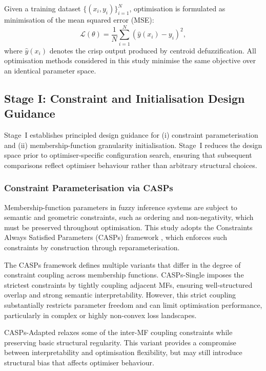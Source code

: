 \documentclass[conference]{IEEEtran}
\begin{document}
Given a training dataset $\{(x_i, y_i)\}_{i=1}^{N}$, optimisation is formulated
as minimisation of the mean squared error (MSE):
\begin{equation}
\mathcal{L}(\theta)
=
\frac{1}{N}
\sum_{i=1}^{N}
\left( \hat{y}(x_i) - y_i \right)^2 ,
\end{equation}
where $\hat{y}(x_i)$ denotes the crisp output produced by centroid
defuzzification.
All optimisation methods considered in this study minimise the same objective
over an identical parameter space.

\subsection{Stage I: Constraint and Initialisation Design Guidance}

Stage~I establishes principled design guidance for
(i) constraint parameterisation and
(ii) membership-function granularity initialisation.
Stage~I reduces the design space prior to optimiser-specific
configuration search, ensuring that subsequent comparisons reflect optimiser
behaviour rather than arbitrary structural choices.

\subsubsection{Constraint Parameterisation via CASPs}

Membership-function parameters in fuzzy inference systems are subject to semantic
and geometric constraints, such as ordering and non-negativity, which must be
preserved throughout optimisation.
This study adopts the Constraints Always Satisfied Parameters (CASPs) framework
\cite{chen2025casp}, which enforces such constraints by construction through
reparameterisation.

The CASPs framework defines multiple variants that differ in the degree of
constraint coupling across membership functions.
CASPs-Single imposes the strictest constraints by tightly coupling adjacent MFs,
ensuring well-structured overlap and strong semantic interpretability.
However, this strict coupling substantially restricts parameter freedom and can
limit optimisation performance, particularly in complex or highly non-convex
loss landscapes.

CASPs-Adapted relaxes some of the inter-MF coupling constraints while preserving
basic structural regularity.
This variant provides a compromise between interpretability and optimisation
flexibility, but may still introduce structural bias that affects optimiser
behaviour.
\end{document}

